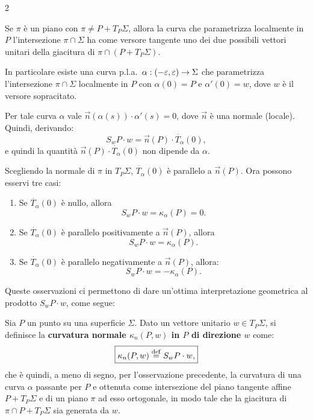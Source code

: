 \begin{multicols*}{2}
    \begin{remark} \label{rmk:curvatura_normale}
        Se $\pi$ è un piano con $\pi \neq P + T_P \Sigma$, allora la curva che parametrizza
        localmente in $P$ l'intersezione $\pi \cap \Sigma$ ha come versore tangente uno
        dei due possibili vettori unitari della giacitura di $\pi \cap (P + T_P \Sigma)$. \smallskip

        In particolare esiste una curva p.l.a.~$\alpha : (-\varepsilon, \varepsilon) \to \Sigma$ che parametrizza
        l'intersezione $\pi \cap \Sigma$ localmente in $P$ con $\alpha(0) = P$ e
        $\alpha'(0) = w$, dove $w$ è il versore sopracitato. \smallskip

        Per tale curva $\alpha$ vale $\vec{n}(\alpha(s)) \cdot \alpha'(s) = 0$, dove
        $\vec{n}$ è una normale (locale). Quindi, derivando:
        \[
            \boxed{S_w P \cdot w = \vec{n}(P) \cdot \dot{T_\alpha}(0),}
        \]
        e quindi la quantità $\vec{n}(P) \cdot \dot{T_\alpha}(0)$ non dipende da $\alpha$. \smallskip

        Scegliendo la normale di $\pi$ in $T_P \Sigma$, $\dot{T_\alpha}(0)$ è parallelo a $\vec{n}(P)$.
        Ora possono esservi tre casi:
        \begin{enumerate}
            \item Se $\dot{T_\alpha}(0)$ è nullo, allora
                  \[ S_w P \cdot w = \kappa_\alpha(P) = 0. \]
            \item Se $\dot{T_\alpha}(0)$ è parallelo positivamente a $\vec{n}(P)$, allora
                  \[ S_w P \cdot w = \kappa_\alpha(P). \]
            \item Se $\dot{T_\alpha}(0)$ è parallelo negativamente a $\vec{n}(P)$, allora:
                  \[ S_w P \cdot w = -\kappa_\alpha(P). \]
        \end{enumerate}

        Queste osservazioni ci permettono di dare un'ottima interpretazione
        geometrica al prodotto $S_w P \cdot w$, come segue:
    \end{remark}

    \begin{definition}
        Sia $P$ un punto su una superficie $\Sigma$. Dato un vettore unitario
        $w \in T_P \Sigma$, si definisce la \textbf{curvatura normale $\kappa_n(P, w)$ in $P$
            di direzione $w$}
        come:
        \[
            \boxed{\kappa_n(P, w) \overset{\mathrm{def}}{=} S_w P \cdot w,}
        \]
        che è quindi, a meno di segno, per l'osservazione precedente, la curvatura di una curva
        $\alpha$ passante per $P$ e ottenuta come intersezione del piano
        tangente affine $P + T_P \Sigma$ e di un piano $\pi$ ad esso ortogonale,
        in modo tale che la giacitura di $\pi \cap P + T_P \Sigma$ sia
        generata da $w$. \smallskip


\end{definition}
\end{multicols*}
